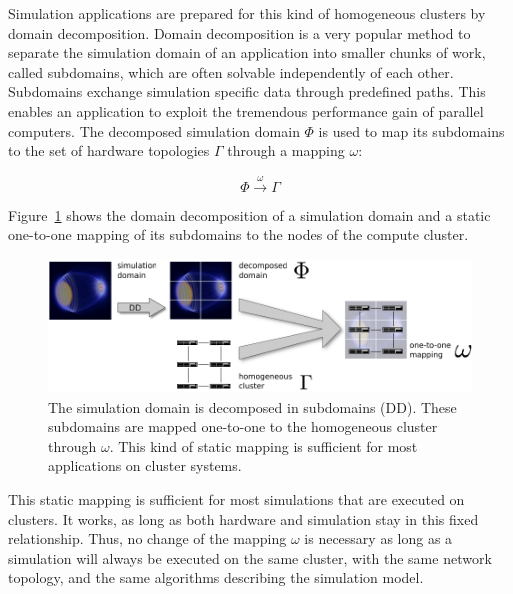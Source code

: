 Simulation applications are prepared for this kind of homogeneous
clusters by domain decomposition. Domain decomposition is a very
popular method to separate the simulation domain of an application
into smaller chunks of work, called subdomains, which are often
solvable independently of each other. Subdomains exchange simulation
specific data through predefined paths. This enables an application to
exploit the tremendous performance gain of parallel computers.  The
decomposed simulation domain $\Phi$ is used to map its subdomains to
the set of hardware topologies $\Gamma$ through a mapping $\omega$:

\[\Phi \xrightarrow{\omega} \Gamma\]

\noindent 
Figure~\ref{fig:domain_decomposition} shows the domain decomposition
of a simulation domain and a static one-to-one mapping of its
subdomains to the nodes of the compute cluster.


\begin{figure}[H]
  \centering \includegraphics[width=\textwidth]{graphics/30_domain_decomposition}
  \caption{The simulation domain is decomposed in subdomains
    (DD). These subdomains are mapped one-to-one to the homogeneous
    cluster through $\omega$.  This kind of static mapping is
    sufficient for most applications on cluster systems.}
  \label{fig:domain_decomposition}
\end{figure}

\noindent This static mapping is sufficient for most simulations that
are executed on clusters. It works, as long as both hardware and
simulation stay in this fixed relationship. Thus, no change
of the mapping $\omega$ is necessary as long as a simulation will always
be executed on the same cluster, with the same network topology, and
the same algorithms describing the simulation model.

